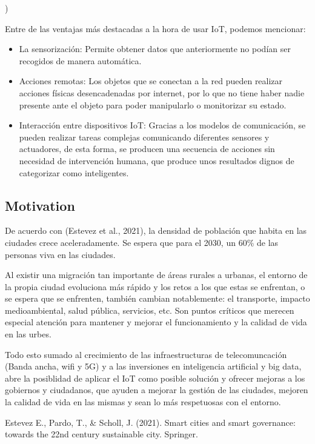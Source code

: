 \documentclass[12pt, a4paper, twoside]{article}
\begin{document}
)

Entre de las ventajas más destacadas a la hora de usar IoT, podemos mencionar:
\begin{itemize}
    \item La sensorización: Permite obtener datos que anteriormente no podían ser recogidos de manera automática.
    \item Acciones remotas: Los objetos que se conectan a la red pueden realizar acciones físicas desencadenadas por internet,
      por lo que no tiene haber nadie presente ante el objeto para poder manipularlo o monitorizar su estado.
    \item Interacción entre dispositivos IoT: Gracias a los modelos de comunicación, se pueden realizar tareas complejas
      comunicando diferentes sensores y actuadores, de esta forma, se producen una secuencia de acciones sin necesidad
      de intervención humana, que produce unos resultados dignos de categorizar como inteligentes.
\end{itemize}

\subsection{Motivation}
    \blindtext[2]

De acuerdo con (Estevez et al., 2021), la densidad de población que habita en las ciudades crece aceleradamente.
Se espera que para el 2030, un 60\% de las personas viva en las ciudades. 

Al existir una migración tan importante de áreas rurales a urbanas, el entorno de la
propia ciudad evoluciona más rápido y los retos a los que estas se enfrentan, o se espera que se enfrenten,
también cambian notablemente: el transporte, impacto medioambiental, salud pública, servicios, etc. Son puntos
críticos que merecen especial atención para mantener y mejorar el funcionamiento y la calidad de vida en
las urbes.

Todo esto sumado al crecimiento de las infraestructuras de telecomuncación (Banda ancha, wifi y 5G)
y a las inversiones en inteligencia artificial y big data, abre la posiblidad de aplicar el IoT como
posible solución y ofrecer mejoras a los gobiernos y ciudadanos, que ayuden a mejorar la gestión de las 
ciudades, mejoren la calidad de vida en las mismas y sean lo más respetuosas con el entorno.

Estevez E., Pardo, T., \& Scholl, J. (2021).
Smart cities and smart governance: towards the 22nd century sustainable city. Springer.
\end{document}
